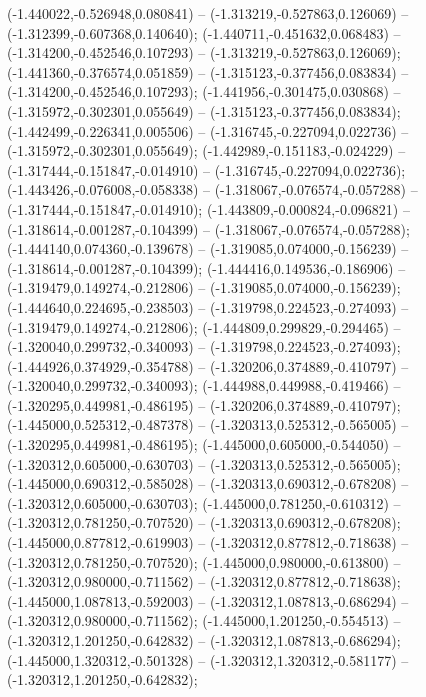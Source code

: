  (-1.440022,-0.526948,0.080841) -- (-1.313219,-0.527863,0.126069) -- (-1.312399,-0.607368,0.140640);
 (-1.440711,-0.451632,0.068483) -- (-1.314200,-0.452546,0.107293) -- (-1.313219,-0.527863,0.126069);
 (-1.441360,-0.376574,0.051859) -- (-1.315123,-0.377456,0.083834) -- (-1.314200,-0.452546,0.107293);
 (-1.441956,-0.301475,0.030868) -- (-1.315972,-0.302301,0.055649) -- (-1.315123,-0.377456,0.083834);
 (-1.442499,-0.226341,0.005506) -- (-1.316745,-0.227094,0.022736) -- (-1.315972,-0.302301,0.055649);
 (-1.442989,-0.151183,-0.024229) -- (-1.317444,-0.151847,-0.014910) -- (-1.316745,-0.227094,0.022736);
 (-1.443426,-0.076008,-0.058338) -- (-1.318067,-0.076574,-0.057288) -- (-1.317444,-0.151847,-0.014910);
 (-1.443809,-0.000824,-0.096821) -- (-1.318614,-0.001287,-0.104399) -- (-1.318067,-0.076574,-0.057288);
 (-1.444140,0.074360,-0.139678) -- (-1.319085,0.074000,-0.156239) -- (-1.318614,-0.001287,-0.104399);
 (-1.444416,0.149536,-0.186906) -- (-1.319479,0.149274,-0.212806) -- (-1.319085,0.074000,-0.156239);
 (-1.444640,0.224695,-0.238503) -- (-1.319798,0.224523,-0.274093) -- (-1.319479,0.149274,-0.212806);
 (-1.444809,0.299829,-0.294465) -- (-1.320040,0.299732,-0.340093) -- (-1.319798,0.224523,-0.274093);
 (-1.444926,0.374929,-0.354788) -- (-1.320206,0.374889,-0.410797) -- (-1.320040,0.299732,-0.340093);
 (-1.444988,0.449988,-0.419466) -- (-1.320295,0.449981,-0.486195) -- (-1.320206,0.374889,-0.410797);
 (-1.445000,0.525312,-0.487378) -- (-1.320313,0.525312,-0.565005) -- (-1.320295,0.449981,-0.486195);
 (-1.445000,0.605000,-0.544050) -- (-1.320312,0.605000,-0.630703) -- (-1.320313,0.525312,-0.565005);
 (-1.445000,0.690312,-0.585028) -- (-1.320313,0.690312,-0.678208) -- (-1.320312,0.605000,-0.630703);
 (-1.445000,0.781250,-0.610312) -- (-1.320312,0.781250,-0.707520) -- (-1.320313,0.690312,-0.678208);
 (-1.445000,0.877812,-0.619903) -- (-1.320312,0.877812,-0.718638) -- (-1.320312,0.781250,-0.707520);
 (-1.445000,0.980000,-0.613800) -- (-1.320312,0.980000,-0.711562) -- (-1.320312,0.877812,-0.718638);
 (-1.445000,1.087813,-0.592003) -- (-1.320312,1.087813,-0.686294) -- (-1.320312,0.980000,-0.711562);
 (-1.445000,1.201250,-0.554513) -- (-1.320312,1.201250,-0.642832) -- (-1.320312,1.087813,-0.686294);
 (-1.445000,1.320312,-0.501328) -- (-1.320312,1.320312,-0.581177) -- (-1.320312,1.201250,-0.642832);

